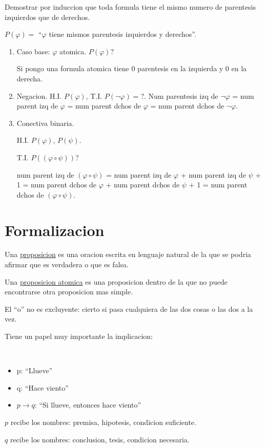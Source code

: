 \begin{example}
	Demostrar por induccion que toda formula tiene el mismo numero de parentesis izquierdos que de derechos.

	\(P(\varphi) = \) ``\(\varphi\) tiene mismos parentesis izquierdos y derechos''.

	\begin{enumerate}
		\item Caso base: \(\varphi\) atomica. \(P(\varphi)?\)

		      Si pongo una formula atomica tiene 0 parentesis en la izquierda y 0 en la derecha.

		\item Negacion. H.I. \(P(\varphi)\), T.I. \(P(\neg \varphi) = ?\).
		      Num parentesis izq de \(\neg \varphi \) = num parent izq de \(\varphi \) = num parent dchos de \(\varphi\) = num parent dchos de \(\neg \varphi\).

		\item Conectiva binaria.

		      H.I. \(P(\varphi)\), \(P(\psi)\).

		      T.I. \(P((\varphi \circ \psi ))\)?

		      num parent izq de \((\varphi \circ  \psi) \) = num parent izq de \(\varphi\) + num parent izq de \(\psi \) + 1 = num parent dchos de \(\varphi\) + num parent dchos de \(\psi \) + 1 = num parent dchos de \((\varphi \circ \psi )\).
	\end{enumerate}
\end{example}

\section{Formalizacion}

\begin{definition}
	Una \underline{proposicion} es una oracion escrita en lenguaje natural de la que se podria afirmar que es verdadera o que es falsa.

	Una \underline{proposicion atomica} es una proposicion dentro de la que no puede encontrarse otra proposicion mas simple.
\end{definition}

\begin{remark}
	El ``o'' no es excluyente: cierto si pasa cualquiera de las dos cosas o las dos a la vez.
\end{remark}

Tiene un papel muy importante la implicacion:
\begin{example}
	~\begin{itemize}
		\item p: ``Llueve''
		\item q: ``Hace viento''
		\item \(p \rightarrow q \): ``Si llueve, entonces hace viento''
	\end{itemize}
	\(p \) recibe los nombres: premisa, hipotesis, condicion suficiente.

	\(q \) recibe los nombres: conclusion, tesis, condicion necesaria.
\end{example}

